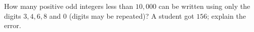 How many positive odd integers less than $10{,}000$ can be written using only the digits $3,4,6,8$ and $0$ (digits may be repeated)? A student got $156$; explain the error.
